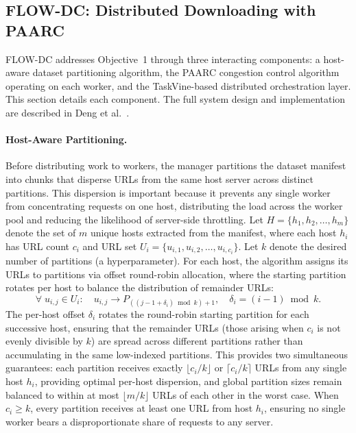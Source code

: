 \documentclass[11pt, letterpaper]{article}
\begin{document}
\subsection{FLOW-DC: Distributed Downloading with PAARC}
\label{sec:flowdc}

FLOW-DC addresses Objective~1 through three interacting components: a
host-aware dataset partitioning algorithm, the PAARC congestion control
algorithm operating on each worker, and the TaskVine-based distributed
orchestration layer. This section details each component. The full system
design and implementation are described in Deng et
al.~\cite{deng2025flowdc}.

\paragraph{Host-Aware Partitioning.}
Before distributing work to workers, the manager partitions the dataset
manifest into chunks that disperse URLs from the same host server across
distinct partitions. This dispersion is important because it prevents any
single worker from concentrating requests on one host, distributing the
load across the worker pool and reducing the likelihood of server-side
throttling. Let
$H = \{h_1, h_2, \ldots, h_m\}$ denote the set of $m$ unique hosts extracted
from the manifest, where each host $h_i$ has URL count $c_i$ and URL set
$U_i = \{u_{i,1}, u_{i,2}, \ldots, u_{i,c_i}\}$. Let $k$ denote the desired
number of partitions (a hyperparameter). For each host, the algorithm assigns its URLs to
partitions via offset round-robin allocation, where the starting partition
rotates per host to balance the distribution of remainder URLs:
%
\begin{equation}
\label{eq:host_dispersion}
\forall\; u_{i,j} \in U_i:\quad
u_{i,j} \longrightarrow P_{((j - 1 + \delta_i) \bmod k) + 1},
\quad \delta_i = (i-1) \bmod k.
\end{equation}
%
The per-host offset $\delta_i$ rotates the round-robin starting partition for
each successive host, ensuring that the remainder URLs (those arising when
$c_i$ is not evenly divisible by $k$) are spread across different partitions
rather than accumulating in the same low-indexed partitions. This provides two
simultaneous guarantees: each partition receives exactly
$\lfloor c_i / k \rfloor$ or $\lceil c_i / k \rceil$ URLs from any single
host $h_i$, providing optimal per-host dispersion, and global partition sizes
remain balanced to within at most $\lfloor m / k \rfloor$ URLs of each other
in the worst case. When $c_i \geq k$, every partition receives at least one
URL from host $h_i$, ensuring no single worker bears a disproportionate share
of requests to any server.
\end{document}
